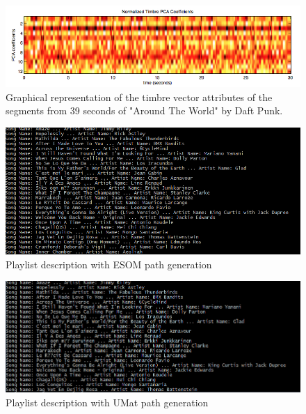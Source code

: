 \vspace{1cm}

\begin{figure}[h!]
    \centering
    \includegraphics[width=\textwidth]{figures/timbre.jpg}
    \caption{Graphical representation of the timbre vector attributes of the segments from 39 seconds of "Around The World" by Daft Punk.}
    \label{fig:timbre}
\end{figure}
\newpage

\begin{figure}[h!]
    \centering
    \includegraphics[width=\textwidth]{figures/ESOMSongs.PNG}
    \caption{Playlist description with ESOM path generation}
    \label{fig:esomres}
\end{figure}

\begin{figure}[h!]
    \centering
    \includegraphics[width=\textwidth]{figures/UMatSongs.PNG}
    \caption{Playlist description with UMat path generation}
    \label{fig:umatres}
\end{figure}
